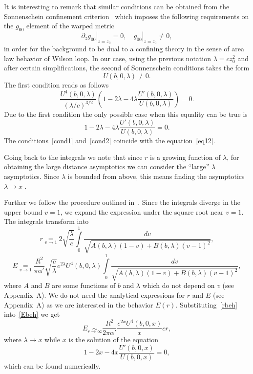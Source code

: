 \documentclass[a4paper,11pt]{article}
\newcommand{\lb}[0]{\left(}
\newcommand{\rb}[0]{\right)}
\newcommand{\pz}{\partial_z}
\begin{document}
It is interesting to remark that similar conditions can be obtained from the Sonnenschein confinement
criterion~\cite{Sonnenschein:2000qm} which imposes the following requirements on the \(g_{00}\) element of the
warped metric
\begin{equation}
\label{sonn_cond}
  \left.\pz g_{00}\right|_{z=z_0}=0,\quad
  \left.g_{00}\right|_{z=z_0}\ne0,
\end{equation}
in order for the background to be dual to a confining theory in the sense of area law behavior of
Wilson loop. In our case, using the
previous notation \(\lambda=cz_0^2\) and after certain simplifications, the second of
Sonnenschein conditions takes the form
\begin{equation}
\label{cond1}
  U(b,0,\lambda)\ne 0.
\end{equation}
The first condition reads as follows
\begin{equation}
  \frac{U^4(b,0,\lambda)}{(\lambda/c)^{3/2}}\lb1-2\lambda-4\lambda\frac{U'(b,0,\lambda)}{U(b,0,\lambda)}\rb=0.
\end{equation}
Due to the first condition the only possible case when this equality can be true is
\begin{equation}
\label{cond2}
  1-2\lambda-4\lambda\frac{U'(b,0,\lambda)}{U(b,0,\lambda)}=0.
\end{equation}
The conditions~\eqref{cond1} and~\eqref{cond2} coincide with the equation~\eqref{eq12}.

Going back to the integrals we note that since \(r\) is a growing function of \(\lambda\),
for obtaining the large distance asymptotics we can consider the ``large'' \(\lambda\) asymptotics.
Since \(\lambda\) is bounded from above, this means finding the asymptotics \(\lambda\to x\) .

Further we follow the procedure outlined in~\cite{Andreev:2006ct}. Since
the integrals diverge in the upper bound \(v=1\), we expand the expression under
the square root near \(v=1\). The integrals transform into
\begin{equation}
\label{rbeh}
  r\underset{v\to1}=2\sqrt{\frac{\lambda}{c}}\int\limits_0^1\frac{dv}{\sqrt{A(b,\lambda)(1-v)+B(b,\lambda)(v-1)^2}},
\end{equation}
\begin{equation}
\label{Ebeh}
  E\underset{v\to1}=\frac{R^2}{\pi\alpha'}\sqrt{\frac{c}{\lambda}}e^{2\lambda}U^4(b,0,\lambda)
  \int\limits_0^1\frac{dv}{\sqrt{A(b,\lambda)(1-v)+B(b,\lambda)(v-1)^2}},
\end{equation}
where \(A\) and \(B\) are some functions of \(b\) and \(\lambda\) which do
not depend on \(v\) (see Appendix~A).  We do not need the analytical expressions for $r$ and $E$
(see Appendix~A) as we are interested in the behavior $E(r)$.
Substituting~\eqref{rbeh} into~\eqref{Ebeh} we get
\begin{equation}
\label{large_r_en}
  E\underset{r\to\infty}{\sim}\frac{R^2}{2\pi\alpha'}\frac{e^{2x}U^4(b,0,x)}{x}cr,
\end{equation}
where  \(\lambda\to x\) while \(x\) is the solution of the equation
\begin{equation}
\label{x_eq}
  1-2x-4x\dfrac{U'(b,0,x)}{U(b,0,x)}=0,
\end{equation}
which can be found numerically.
\end{document}
